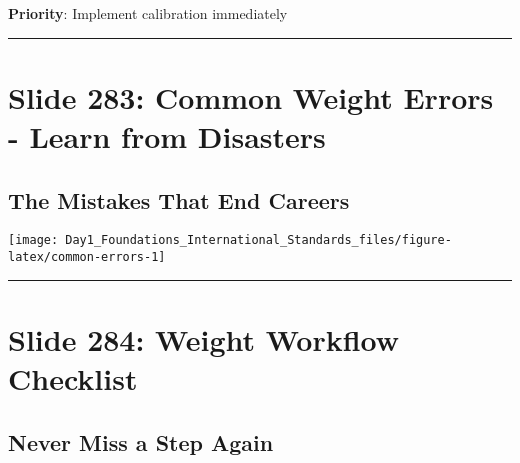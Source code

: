 \documentclass[
]{article}
\begin{document}
\textbf{Priority}: Implement calibration immediately

\begin{center}\rule{0.5\linewidth}{0.5pt}\end{center}

\section{Slide 283: Common Weight Errors - Learn from
Disasters}\label{slide-283-common-weight-errors---learn-from-disasters}

\subsection{The Mistakes That End
Careers}\label{the-mistakes-that-end-careers}

\texttt{[image: Day1\_Foundations\_International\_Standards\_files/figure-latex/common-errors-1]}

\begin{center}\rule{0.5\linewidth}{0.5pt}\end{center}

\section{Slide 284: Weight Workflow
Checklist}\label{slide-284-weight-workflow-checklist}

\subsection{Never Miss a Step Again}\label{never-miss-a-step-again}
\end{document}
